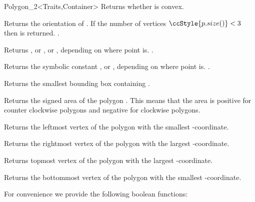 \begin{ccClassTemplate}{Polygon_2<Traits,Container>}
    { Returns whether  is convex. }

    { Returns the orientation of \ccVar. If the number of vertices 
      $\ccStyle{p.size()} < 3$ then  is returned.
      \ccPrecond {}.
    }

    { Returns , or ,
       or , 
       depending on where point  is.
      \ccPrecond {}.
    }

    { Returns the symbolic constant , 
      or , depending on where point
       is.
      \ccPrecond {}.
    }

    { Returns the smallest bounding box containing \ccVar.}
    
    { Returns the signed area of the polygon \ccVar. This means that the area is
      positive for counter clockwise polygons and negative for clockwise polygons.
    }
      
    { Returns the leftmost vertex of the polygon  with the smallest
     -coordinate. }
    
    { Returns the rightmost vertex of the polygon  with the largest
     -coordinate. }
    
    { Returns topmost vertex of the polygon  with the largest
     -coordinate. }
    
    { Returns the bottommost vertex of the polygon  with the smallest
     -coordinate. }
    
\newpage
For convenience we provide the following boolean functions:    

    {}

\ccGlue
{}
    {}


\end{ccClassTemplate}
